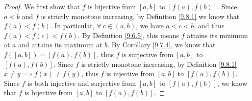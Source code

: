 \begin{proof}
    We first show that \(f\) is bijective from \([a, b]\) to \([f(a), f(b)]\).
    Since \(a < b\) and \(f\) is strictly monotone increasing, by Definition \ref{9.8.1} we know that \(f(a) < f(b)\).
    In particular, \(\forall\ c \in (a, b)\), we have \(a < c < b\), and thus \(f(a) < f(c) < f(b)\).
    By Definition \ref{9.6.5}, this means \(f\) attains its minimum at \(a\) and attains its maximum at \(b\).
    By Corollary \ref{9.7.4}, we know that \(f([a, b]) = [f(a), f(b)]\), thus \(f\) is surjective from \([a, b]\) to \([f(a), f(b)]\).
    Since \(f\) is strictly monotone increasing, by Definition \ref{9.8.1} \(x \neq y \implies f(x) \neq f(y)\), thus \(f\) is injective from \([a, b]\) to \([f(a), f(b)]\).
    Since \(f\) is both injective and surjective from \([a, b]\) to \([f(a), f(b)]\), we know that \(f\) is bijective from \([a, b]\) to \([f(a), f(b)]\).


\end{proof}
